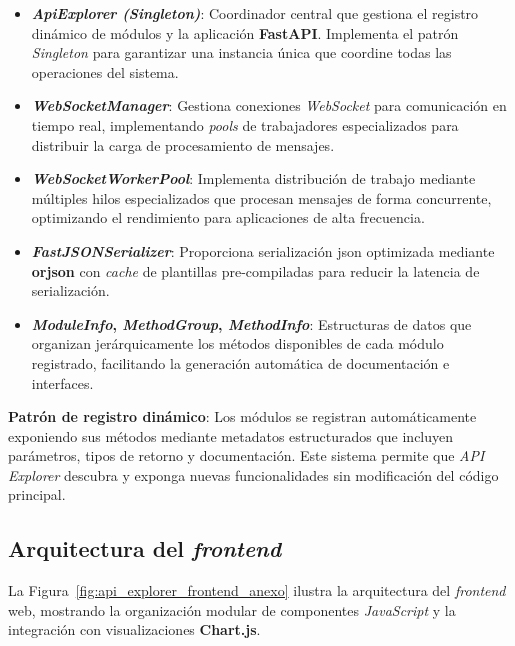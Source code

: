 \begin{itemize}
    \item \textbf{\textit{ApiExplorer (Singleton)}}: Coordinador central que gestiona el registro dinámico de módulos y la aplicación \textbf{FastAPI}. Implementa el patrón \textit{Singleton} para garantizar una instancia única que coordine todas las operaciones del sistema.

    \item \textbf{\textit{WebSocketManager}}: Gestiona conexiones \textit{WebSocket} para comunicación en tiempo real, implementando \textit{pools} de trabajadores especializados para distribuir la carga de procesamiento de mensajes.

    \item \textbf{\textit{WebSocketWorkerPool}}: Implementa distribución de trabajo mediante múltiples hilos especializados que procesan mensajes de forma concurrente, optimizando el rendimiento para aplicaciones de alta frecuencia.

    \item \textbf{\textit{FastJSONSerializer}}: Proporciona serialización \acrshort{json} optimizada mediante \textbf{orjson} con \textit{cache} de plantillas pre-compiladas para reducir la latencia de serialización.

    \item \textbf{\textit{ModuleInfo}, \textit{MethodGroup}, \textit{MethodInfo}}: Estructuras de datos que organizan jerárquicamente los métodos disponibles de cada módulo registrado, facilitando la generación automática de documentación e interfaces.
\end{itemize}

\textbf{Patrón de registro dinámico}: Los módulos se registran automáticamente exponiendo sus métodos mediante metadatos estructurados que incluyen parámetros, tipos de retorno y documentación. Este sistema permite que \textit{\textit{API Explorer}} descubra y exponga nuevas funcionalidades sin modificación del código principal.

\subsection{Arquitectura del \textit{frontend}}
\label{subsec:anexo_api_explorer_frontend}

La Figura~\ref{fig:api_explorer_frontend_anexo} ilustra la arquitectura del \textit{frontend} web, mostrando la organización modular de componentes \textit{JavaScript} y la integración con visualizaciones \textbf{Chart.js}.

